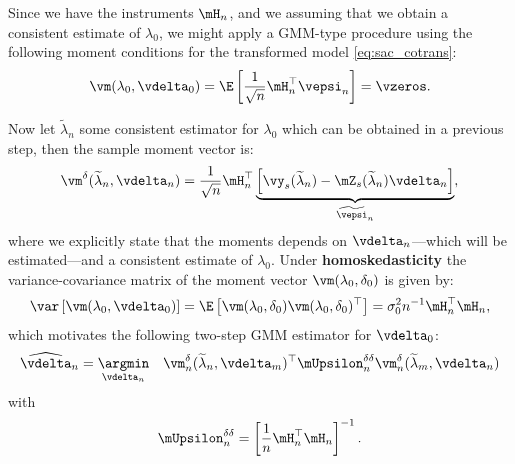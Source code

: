 Since we have the instruments $\mH_n$, and we assuming that we obtain a consistent estimate of $\lambda_0$, we might apply a GMM-type procedure using the following moment conditions for the transformed model \eqref{eq:sac_cotrans}:
\begin{equation*}
  \vm(\lambda_0, \vdelta_0) = \E\left[\frac{1}{\sqrt{n}}\mH_n^\top\vepsi_n\right] = \vzeros.
\end{equation*}

Now let $\widetilde{\lambda}_n$ some consistent estimator for $\lambda_0$ which can be obtained in a previous step, then the sample moment vector is:
\begin{equation*}
  \vm^{\delta}(\widetilde{\lambda}_n, \vdelta_n) = \frac{1}{\sqrt{n}}\mH^\top_n\underbrace{\left[\vy_s(\widetilde{\lambda}_n) - \mZ_s(\widetilde{\lambda}_n)\vdelta_n\right]}_{\widetilde{\vepsi}_n},
\end{equation*}
%
where we explicitly state that the moments depends on $\vdelta_n$---which will be estimated---and a consistent estimate of $\lambda_0$. Under \textbf{homoskedasticity} the variance-covariance matrix of the moment vector $\vm(\lambda_0, \delta_0)$ is given by:
\begin{equation*}
  \var\left[\vm(\lambda_0, \vdelta_0)\right] = \E\left[\vm(\lambda_0, \delta_0)\vm(\lambda_0, \delta_0)^\top\right] = \sigma^2_0n^{-1}\mH^\top_n\mH_n,
\end{equation*}
%
which motivates the following two-step GMM estimator for $\vdelta_0$:
\begin{equation*}
  \widehat{\vdelta}_n = \underset{\vdelta_n}{\argmin}\quad \vm^{\delta}_n(\widetilde{\lambda}_n, \vdelta_m)^\top \mUpsilon^{\delta\delta}_n\vm^{\delta}_n(\widetilde{\lambda}_m, \vdelta_n)
\end{equation*}
%
with
\begin{equation*}
\mUpsilon^{\delta\delta}_n = \left[\frac{1}{n}\mH^\top_n\mH_n\right]^{-1}.
\end{equation*}

